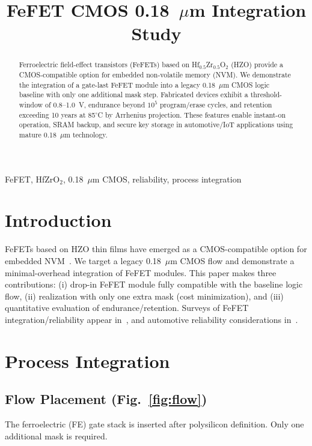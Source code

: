 \documentclass[conference]{IEEEtran}
\begin{document}
\title{FeFET CMOS 0.18~$\mu$m Integration Study}

\author{
}
\maketitle

\begin{abstract}
Ferroelectric field-effect transistors (FeFETs) based on Hf$_{0.5}$Zr$_{0.5}$O$_2$ (HZO) provide a CMOS-compatible option for embedded non-volatile memory (NVM). We demonstrate the integration of a gate-last FeFET module into a legacy 0.18~$\mu$m CMOS logic baseline with only one additional mask step. Fabricated devices exhibit a threshold-window of 0.8--1.0~V, endurance beyond $10^5$ program/erase cycles, and retention exceeding 10 years at 85$^\circ$C by Arrhenius projection. These features enable instant-on operation, SRAM backup, and secure key storage in automotive/IoT applications using mature 0.18~$\mu$m technology.
\end{abstract}

\begin{IEEEkeywords}
FeFET, HfZrO$_2$, 0.18~$\mu$m CMOS, reliability, process integration
\end{IEEEkeywords}

\section{Introduction}
FeFETs based on HZO thin films have emerged as a CMOS-compatible option for embedded NVM~\cite{Boscke2011,Mueller2012,Schenk2019}. We target a legacy 0.18~$\mu$m CMOS flow and demonstrate a minimal-overhead integration of FeFET modules. This paper makes three contributions: (i) drop-in FeFET module fully compatible with the baseline logic flow, (ii) realization with only one extra mask (cost minimization), and (iii) quantitative evaluation of endurance/retention. Surveys of FeFET integration/reliability appear in~\cite{Mueller2015,Park2020}, and automotive reliability considerations in~\cite{Nakamura2003}.

\section{Process Integration}
\subsection{Flow Placement (Fig.~\ref{fig:flow})}
The ferroelectric (FE) gate stack is inserted after polysilicon definition. Only one additional mask is required.
\end{document}
